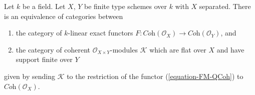 \begin{lemma}
\label{lemma-functor-coherent-over-field}
Let $k$ be a field. Let $X$, $Y$ be finite type schemes over $k$ with
$X$ separated. There is an equivalence of categories between
\begin{enumerate}
\item the category of $k$-linear exact functors
$F : \textit{Coh}(\mathcal{O}_X) \to \textit{Coh}(\mathcal{O}_Y)$, and
\item the category of coherent $\mathcal{O}_{X \times Y}$-modules
$\mathcal{K}$ which are flat over $X$ and have support finite over $Y$
\end{enumerate}
given by sending $\mathcal{K}$ to the restriction of the functor
(\ref{equation-FM-QCoh}) to $\textit{Coh}(\mathcal{O}_X)$.
\end{lemma}

